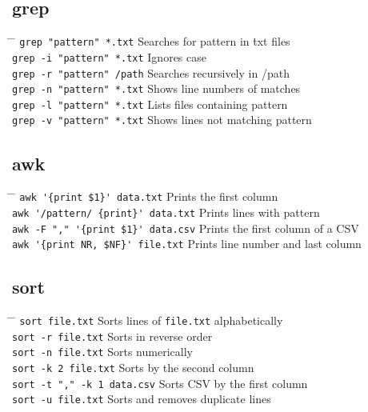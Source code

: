 \documentclass[a4paper,10pt]{article}
\begin{document}
\subsection{grep}
\begin{tabbing}
	\= \hspace{60mm} \= \hspace{80mm} \kill
	\> \verb|grep "pattern" *.txt| \> Searches for pattern in \.txt files \\
	\> \verb|grep -i "pattern" *.txt| \> Ignores case \\
	\> \verb|grep -r "pattern" /path| \> Searches recursively in /path \\
	\> \verb|grep -n "pattern" *.txt| \> Shows line numbers of matches \\
	\> \verb|grep -l "pattern" *.txt| \> Lists files containing pattern \\
	\> \verb|grep -v "pattern" *.txt| \> Shows lines not matching pattern \\
\end{tabbing}

\subsection{awk}
\begin{tabbing}
	\= \hspace{60mm} \= \hspace{80mm} \kill
	\> \verb|awk '{print $1}' data.txt| \> Prints the first column \\
	\> \verb|awk '/pattern/ {print}' data.txt| \> Prints lines with pattern \\
	\> \verb|awk -F "," '{print $1}' data.csv| \> Prints the first column of a CSV \\
	\> \verb|awk '{print NR, $NF}' file.txt| \> Prints line number and last column \\
\end{tabbing}

\subsection{sort}
\begin{tabbing}
	\= \hspace{60mm} \= \hspace{80mm} \kill
	\> \verb|sort file.txt| \> Sorts lines of \verb|file.txt| alphabetically \\
	\> \verb|sort -r file.txt| \> Sorts in reverse order \\
	\> \verb|sort -n file.txt| \> Sorts numerically \\
	\> \verb|sort -k 2 file.txt| \> Sorts by the second column \\
	\> \verb|sort -t "," -k 1 data.csv| \> Sorts CSV by the first column \\
	\> \verb|sort -u file.txt| \> Sorts and removes duplicate lines \\
\end{tabbing}
\end{document}
